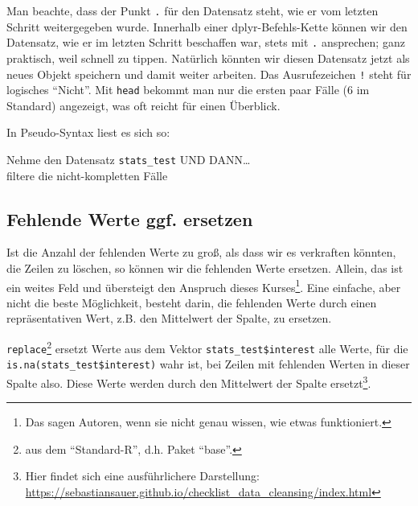\documentclass[12pt,ngerman,]{book}
\makeatletter
\newenvironment{Shaded}{\begin{snugshade}}{\end{snugshade}}
\newcommand{\KeywordTok}[1]{\textcolor[rgb]{0.13,0.29,0.53}{\textbf{{#1}}}}
\newcommand{\DataTypeTok}[1]{\textcolor[rgb]{0.13,0.29,0.53}{{#1}}}
\newcommand{\StringTok}[1]{\textcolor[rgb]{0.31,0.60,0.02}{{#1}}}
\newcommand{\CommentTok}[1]{\textcolor[rgb]{0.56,0.35,0.01}{\textit{{#1}}}}
\newcommand{\OtherTok}[1]{\textcolor[rgb]{0.56,0.35,0.01}{{#1}}}
\newcommand{\NormalTok}[1]{{#1}}
\let\rmarkdownfootnote\footnote%
\def\footnote{\protect\rmarkdownfootnote}
\newenvironment{kframe}{%
\medskip{}
\setlength{\fboxsep}{.8em}
 \def\at@end@of@kframe{}%
 \ifinner\ifhmode%
  \def\at@end@of@kframe{\end{minipage}}%
  \begin{minipage}{\columnwidth}%
 \fi\fi%
 \def\FrameCommand##1{\hskip\@totalleftmargin \hskip-\fboxsep
 \colorbox{shadecolor}{##1}\hskip-\fboxsep
     \hskip-\linewidth \hskip-\@totalleftmargin \hskip\columnwidth}%
 \MakeFramed {\advance\hsize-\width
   \@totalleftmargin\z@ \linewidth\hsize
   \@setminipage}}%
 {\par\unskip\endMakeFramed%
 \at@end@of@kframe}
\renewenvironment{Shaded}{\begin{kframe}}{\end{kframe}}
\theoremstyle{definition}
\theoremstyle{definition}
\theoremstyle{remark}
\let\BeginKnitrBlock\begin \let\EndKnitrBlock\end
\makeatother
\begin{document}
Man beachte, dass der Punkt \texttt{.} für den Datensatz steht, wie er
vom letzten Schritt weitergegeben wurde. Innerhalb einer
dplyr-Befehls-Kette können wir den Datensatz, wie er im letzten Schritt
beschaffen war, stets mit \texttt{.} ansprechen; ganz praktisch, weil
schnell zu tippen. Natürlich könnten wir diesen Datensatz jetzt als
neues Objekt speichern und damit weiter arbeiten. Das Ausrufezeichen
\texttt{!} steht für logisches ``Nicht''. Mit \texttt{head} bekommt man
nur die ersten paar Fälle (6 im Standard) angezeigt, was oft reicht für
einen Überblick.

In Pseudo-Syntax liest es sich so:

\BeginKnitrBlock{rmdpseudocode}
Nehme den Datensatz \texttt{stats\_test} UND DANN\ldots{}\\
filtere die nicht-kompletten Fälle
\EndKnitrBlock{rmdpseudocode}

\subsection{Fehlende Werte ggf.
ersetzen}\label{fehlende-werte-ggf.-ersetzen}

Ist die Anzahl der fehlenden Werte zu groß, als dass wir es verkraften
könnten, die Zeilen zu löschen, so können wir die fehlenden Werte
ersetzen. Allein, das ist ein weites Feld und übersteigt den Anspruch
dieses Kurses\footnote{Das sagen Autoren, wenn sie nicht genau wissen,
  wie etwas funktioniert.}. Eine einfache, aber nicht die beste
Möglichkeit, besteht darin, die fehlenden Werte durch einen
repräsentativen Wert, z.B. den Mittelwert der Spalte, zu ersetzen.

\begin{Shaded}
\end{Shaded}

\texttt{replace}\footnote{aus dem ``Standard-R'', d.h. Paket ``base''.}
ersetzt Werte aus dem Vektor \texttt{stats\_test\$interest} alle Werte,
für die \texttt{is.na(stats\_test\$interest)} wahr ist, bei Zeilen mit
fehlenden Werten in dieser Spalte also. Diese Werte werden durch den
Mittelwert der Spalte ersetzt\footnote{Hier findet sich eine
  ausführlichere Darstellung:
  \url{https://sebastiansauer.github.io/checklist_data_cleansing/index.html}}.
\end{document}
